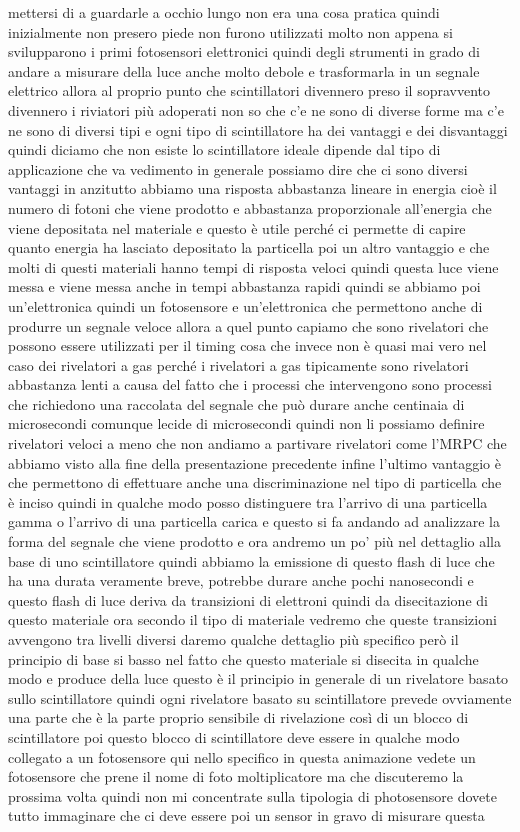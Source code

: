 mettersi di a guardarle a occhio lungo non era una cosa pratica quindi inizialmente non presero piede non furono utilizzati molto non appena si svilupparono i primi fotosensori elettronici quindi degli strumenti in grado di andare a misurare della luce anche molto debole e trasformarla in un segnale elettrico allora al proprio punto che scintillatori divennero preso il sopravvento divennero i riviatori più adoperati non so che c'e ne sono di diverse forme ma c'e ne sono di diversi tipi e ogni tipo di scintillatore ha dei vantaggi e dei disvantaggi quindi diciamo che non esiste lo scintillatore ideale dipende dal tipo di applicazione che va vedimento in generale possiamo dire che ci sono diversi vantaggi in anzitutto abbiamo una risposta abbastanza lineare in energia cioè il numero di fotoni che viene prodotto e abbastanza proporzionale all'energia che viene depositata nel materiale e questo è utile perché ci permette di capire quanto energia ha lasciato depositato la particella poi un altro vantaggio e che molti di questi materiali hanno tempi di risposta veloci quindi questa luce viene messa e viene messa anche in tempi abbastanza rapidi quindi se abbiamo poi un'elettronica quindi un fotosensore e un'elettronica che permettono anche di produrre un segnale veloce allora a quel punto capiamo che sono rivelatori che possono essere utilizzati per il timing cosa che invece non è quasi mai vero nel caso dei rivelatori a gas perché i rivelatori a gas tipicamente sono rivelatori abbastanza lenti a causa del fatto che i processi che intervengono sono processi che richiedono una raccolata del segnale che può durare anche centinaia di microsecondi comunque lecide di microsecondi quindi non li possiamo definire rivelatori veloci a meno che non andiamo a partivare rivelatori come l'MRPC che abbiamo visto alla fine della presentazione precedente infine l'ultimo vantaggio è che permettono di effettuare anche una discriminazione nel tipo di particella che è inciso quindi in qualche modo posso distinguere tra l'arrivo di una particella gamma o l'arrivo di una particella carica e questo si fa andando ad analizzare la forma del segnale che viene prodotto e ora andremo un po' più nel dettaglio alla base di uno scintillatore quindi abbiamo la emissione di questo flash di luce che ha una durata veramente breve, potrebbe durare anche pochi nanosecondi e questo flash di luce deriva da transizioni di elettroni quindi da disecitazione di questo materiale ora secondo il tipo di materiale vedremo che queste transizioni avvengono tra livelli diversi daremo qualche dettaglio più specifico però il principio di base si basso nel fatto che questo materiale si disecita in qualche modo e produce della luce questo è il principio in generale di un rivelatore basato sullo scintillatore quindi ogni rivelatore basato su scintillatore prevede ovviamente una parte che è la parte proprio sensibile di rivelazione così di un blocco di scintillatore poi questo blocco di scintillatore deve essere in qualche modo collegato a un fotosensore qui nello specifico in questa animazione vedete un fotosensore che prene il nome di foto moltiplicatore ma che discuteremo la prossima volta quindi non mi concentrate sulla tipologia di photosensore dovete tutto immaginare che ci deve essere poi un sensor in gravo di misurare questa 